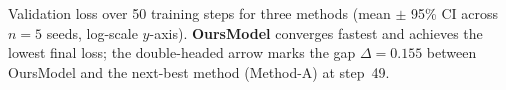 \caption{Validation loss over 50 training steps for three methods (mean $\pm$ 95\% CI across $n{=}5$ seeds, log-scale $y$-axis). \textbf{OursModel} converges fastest and achieves the lowest final loss; the double-headed arrow marks the gap $\Delta{=}0.155$ between OursModel and the next-best method (Method-A) at step~49.}
